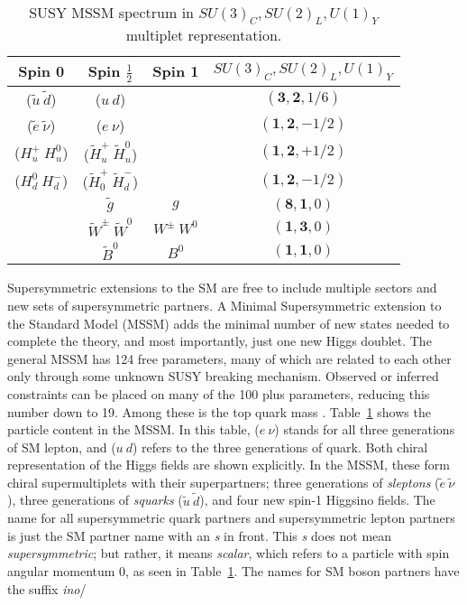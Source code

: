 \begin{table}[!htp]
\centering
\small
\begin{tabular}{|c|c|c|c|}
\hline
Spin 0  & Spin $\frac{1}{2}$& Spin 1 &  $SU(3)_{C}, SU(2)_{L}, U(1)_{Y}$ \\
\hline \hline
($\tilde{u}~\tilde{d}$) & ($u~d$)&   & $(\mathbf{3}, \mathbf{2}, 1/6)$ \\ 
\hline
($\tilde{e}~\tilde{\nu}$) & ($e~\nu$)&   & $(\mathbf{1}, \mathbf{2}, -1/2)$ \\
\hline
($H_u^+~H_u^0$)&($\tilde{H}_u^+~\tilde{H}_u^0$) && $(\mathbf{1}, \mathbf{2}, +1/2)$\\
($H_d^0~H_d^-$)&($\tilde{H}_0^+~\tilde{H}_d^-$) & &$(\mathbf{1}, \mathbf{2}, -1/2)$\\
\hline
 &$\tilde{g}$&  $g$ & $(\mathbf{8}, \mathbf{1}, 0)$ \\
\hline
& $\tilde{W}^\pm~ \tilde{W}^0$& $W^\pm~ W^0$ & $(\mathbf{1}, \mathbf{3}, 0)$  \\  
 & $\tilde{B}^0$& $B^0$ & $(\mathbf{1}, \mathbf{1}, 0)$\\ 
\hline

\hline %
\end{tabular}
\caption{SUSY MSSM spectrum in $SU(3)_{C}, SU(2)_{L}, U(1)_{Y}$ multiplet representation.}
\label{tab:susy}
\end{table}
Supersymmetric extensions to the SM are free to include multiple sectors and new sets of supersymmetric partners.  A Minimal Supersymmetric extension to the Standard Model (MSSM) adds the minimal number of new states needed to complete the theory, and most importantly, just one new Higgs doublet.  The general MSSM has 124 free parameters, many of which are related to each other only through some unknown SUSY breaking mechanism.  Observed or inferred constraints can be placed on many of the 100 plus parameters, reducing this number down to 19.  Among these is the top quark mass \cite{Bechtle2006}.  Table~\ref{tab:susy} shows the particle content in the MSSM.  In this table,  ($e~\nu$) stands for all three generations of SM lepton, and ($u~d$) refers to the three generations of quark.  Both chiral representation of the Higgs fields are shown explicitly.  In the MSSM, these form chiral supermultiplets with their superpartners; three generations of \textit{sleptons} ($\tilde{e}~\tilde{\nu}$), three generations of \textit{squarks} ($\tilde{u}~\tilde{d}$), and four new spin-1 Higgsino fields.  The name for all supersymmetric quark partners and supersymmetric lepton partners is just the SM partner name with an \textit{s} in front.  This \textit{s} does not mean \textit{supersymmetric}; but rather, it means \textit{scalar}, which refers to a particle with spin angular momentum 0, as seen in Table~\ref{tab:susy}.  The names for SM boson partners have the suffix \textit{ino}/

